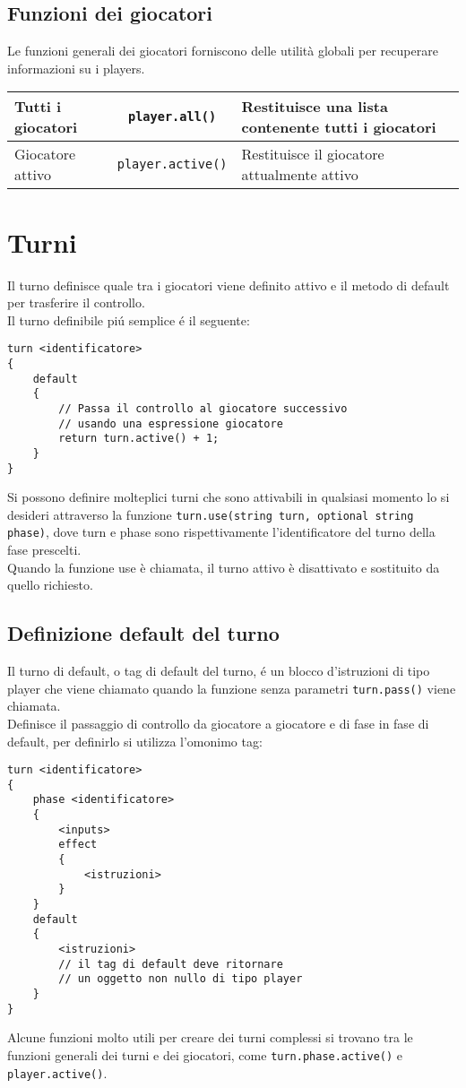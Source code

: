 \subsection{Funzioni dei giocatori}
Le funzioni generali dei giocatori forniscono delle utilità globali  per recuperare informazioni 
su i players. 
\begin{center}
\begin{tabularx}{\linewidth}{|l|c|X|}
    \hline
    Tutti i giocatori & \lstinline|player.all()| & Restituisce una lista contenente tutti i giocatori \\
    \hline
    Giocatore attivo & \lstinline|player.active()| & Restituisce il giocatore attualmente attivo \\
    \hline
\end{tabularx}
\end{center}

\section{Turni}
Il turno definisce quale tra i giocatori viene definito attivo e il metodo di default
per trasferire il controllo. \\
Il turno definibile piú semplice é il seguente:
\begin{lstlisting}
turn <identificatore>
{
    default
    {
        // Passa il controllo al giocatore successivo 
        // usando una espressione giocatore
        return turn.active() + 1;
    }
}
\end{lstlisting}
Si possono definire molteplici turni che sono attivabili in qualsiasi momento lo si desideri 
attraverso la funzione \lstinline|turn.use(string turn, optional string phase)|, dove
turn e phase sono rispettivamente l'identificatore del turno della fase prescelti. \\
Quando la funzione use è chiamata, il turno attivo è disattivato e sostituito da quello richiesto.

\subsection{Definizione default del turno}
Il turno di default, o tag di default del turno, é un blocco d'istruzioni di tipo player
che viene chiamato quando la funzione senza parametri \lstinline|turn.pass()| viene chiamata. \\
Definisce il passaggio di controllo da giocatore a giocatore e di fase in fase di default,
per definirlo si utilizza l'omonimo tag:
\begin{lstlisting}
turn <identificatore>
{
    phase <identificatore>
    {
        <inputs>
        effect
        {
            <istruzioni>
        }
    }
    default
    {
        <istruzioni>
        // il tag di default deve ritornare 
        // un oggetto non nullo di tipo player
    }
}
\end{lstlisting}
Alcune funzioni molto utili per creare dei turni complessi si trovano tra le 
funzioni generali dei turni e dei giocatori, come \lstinline|turn.phase.active()| e
\lstinline|player.active()|.

